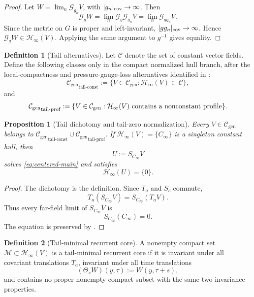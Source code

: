 \documentclass[11pt]{amsart}
\numberwithin{equation}{section}
\theoremstyle{plain}
\newtheorem{proposition}[proposition]{Proposition}
\theoremstyle{definition}
\newtheorem{definition}[definition]{Definition}
\theoremstyle{remark}
\newcommand{\calM}{\mathcal M}
\newcommand{\calC}{\mathcal C}
\newcommand{\calH}{\mathcal H}
\newcommand{\Cgen}{\mathcal C_{\mathrm{gen}}}
\begin{document}
\begin{proof}
Let \(W=\lim_n\mathscr G_{g_n}V\), with \(|g_n|_{\rm cov}\to\infty\).  Then
\[
   \mathscr G_gW
   =
   \lim_n\mathscr G_g\mathscr G_{g_n}V
   =
   \lim_n\mathscr G_{gg_n}V .
\]
Since the metric on \(G\) is proper and left-invariant, \(|gg_n|_{\rm cov}\to
\infty\).  Hence \(\mathscr G_gW\in\calH_\infty(V)\).  Applying the same
argument to \(g^{-1}\) gives equality.
\end{proof}

\begin{definition}[Tail alternatives]
\label{def:R4-tail-strata}
Let \(\calC\) denote the set of constant vector fields.  Define
the following classes only in the compact normalized hull branch, after the
local-compactness and pressure-gauge-loss alternatives identified in
:
\[
   {\Cgen}_{\mathrm{tail\text{-}const}}
   :=
   \{V\in\Cgen:\calH_\infty(V)\subset\calC\},
\]
and
\[
   {\Cgen}_{\mathrm{tail\text{-}prof}}
   :=
   \{V\in\Cgen:\calH_\infty(V)\hbox{ contains a nonconstant profile}\}.
\]
\end{definition}

\begin{proposition}[Tail dichotomy and tail-zero normalization]
\label{prop:tail-dichotomy}
Every \(V\in\Cgen\) belongs to
\({\Cgen}_{\mathrm{tail\text{-}const}}\cup
{\Cgen}_{\mathrm{tail\text{-}prof}}\).  If
\(\calH_\infty(V)=\{C_\infty\}\) is a singleton constant hull, then
\[
   U:=S_{C_\infty}V
\]
solves \eqref{eq:centered-main} and satisfies
\[
   \calH_\infty(U)=\{0\}.
\]
\end{proposition}

\begin{proof}
The dichotomy is the definition.  Since \(T_a\) and \(S_c\) commute,
\[
   T_a(S_{C_\infty}V)=S_{C_\infty}(T_aV).
\]
Thus every far-field limit of \(S_{C_\infty}V\) is
\[
   S_{C_\infty}(C_\infty)=0.
\]
The equation is preserved by .
\end{proof}

\begin{definition}[Tail-minimal recurrent core]
\label{def:tail-minimal-core}
A nonempty compact set \(\calM\subset\calH_\infty(V)\) is a tail-minimal
recurrent core if it is invariant under all covariant translations \(T_a\),
invariant under all time translations
\[
   (\Theta_sW)(y,\tau):=W(y,\tau+s),
\]
and contains no proper nonempty compact subset with the same two invariance
properties.
\end{definition}
\end{document}
